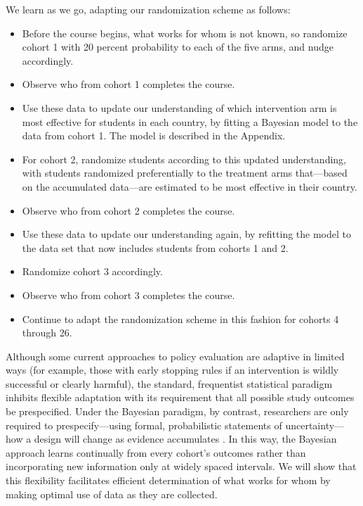 \documentclass{acm_proc_article-sp}
\begin{document}
We learn as we go, adapting our randomization scheme as follows:
\begin{itemize}
    \item Before the course begins, what works for whom is not known, so randomize cohort 1 with 20 percent probability to each of the five arms, and nudge accordingly.
    \item Observe who from cohort 1 completes the course.
    \item Use these data to update our understanding of which intervention arm is most effective for students in each country, by fitting a Bayesian model to the data from cohort 1. The model is described in the Appendix.
    \item For cohort 2, randomize students according to this updated understanding, with students randomized preferentially to the treatment arms that---based on the accumulated data---are estimated to be most effective in their country.
    \item Observe who from cohort 2 completes the course.
    \item Use these data to update our understanding again, by refitting the model to the data set that now includes students from cohorts 1 and 2.
    \item Randomize cohort 3 accordingly.
    \item Observe who from cohort 3 completes the course.
    \item Continue to adapt the randomization scheme in this fashion for cohorts 4 through 26.
\end{itemize}

Although some current approaches to policy evaluation are adaptive in limited ways (for example, those with early stopping rules if an intervention is wildly successful or clearly harmful), the standard, frequentist statistical paradigm inhibits flexible adaptation with its requirement that all possible study outcomes be prespecified. Under the Bayesian paradigm, by contrast, researchers are only required to prespecify---using formal, probabilistic statements of uncertainty---how a design will change as evidence accumulates \cite{berry2006bayesian, george1994stopping}. In this way, the Bayesian approach learns continually from every cohort's outcomes rather than incorporating new information only at widely spaced intervals. We will show that this flexibility facilitates efficient determination of what works for whom by making optimal use of data as they are collected.
\end{document}
